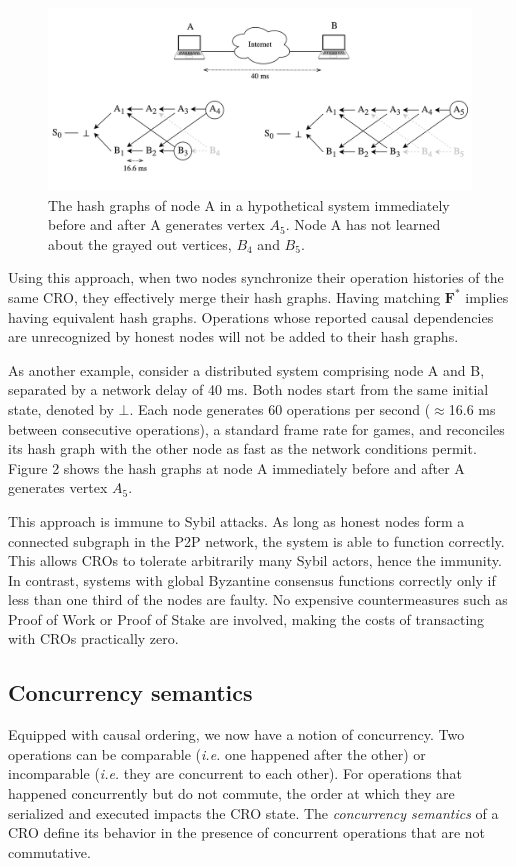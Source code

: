 \documentclass{article}
\begin{document}
\begin{figure}[htp]
    \centering
    \includegraphics[width=16cm]{fig2}
    \caption{The hash graphs of node A in a hypothetical system immediately before and after A generates vertex $A_5$. Node A has not learned about the grayed out vertices, $B_4$ and $B_5$.}
    \label{fig:2}
\end{figure}

Using this approach, when two nodes synchronize their operation histories of the same CRO, they effectively merge their hash graphs. Having matching $\textbf{F}^*$ implies having equivalent hash graphs. Operations whose reported causal dependencies are unrecognized by honest nodes will not be added to their hash graphs.

As another example, consider a distributed system comprising node A and B, separated by a network delay of 40 ms. Both nodes start from the same initial state, denoted by $\bot$. Each node generates 60 operations per second ($\approx$16.6 ms between consecutive operations), a standard frame rate for games, and reconciles its hash graph with the other node as fast as the network conditions permit. Figure 2 shows the hash graphs at node A immediately before and after A generates vertex $A_5$.

This approach is immune to Sybil attacks. As long as honest nodes form a connected subgraph in the P2P network, the system is able to function correctly. This allows CROs to tolerate arbitrarily many Sybil actors, hence the immunity. In contrast, systems with global Byzantine consensus functions correctly only if less than one third of the nodes are faulty. No expensive countermeasures such as Proof of Work or Proof of Stake are involved, making the costs of transacting with CROs practically zero.

\subsection{Concurrency semantics}
Equipped with causal ordering, we now have a notion of concurrency. Two operations can be comparable (\textit{i.e.} one happened after the other) or incomparable (\textit{i.e.} they are concurrent to each other). For operations that happened concurrently but do not commute, the order at which they are serialized and executed impacts the CRO state. The \textit{concurrency semantics} of a CRO define its behavior in the presence of concurrent operations that are not commutative.
\end{document}
